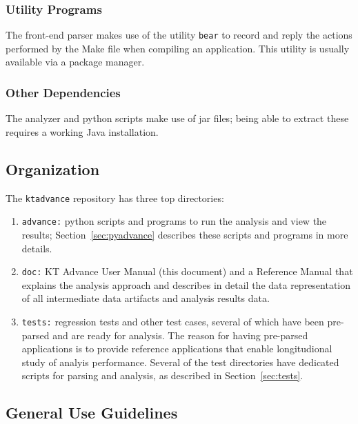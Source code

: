 \documentclass[11pt]{article}
\begin{document}
\subsubsection{Utility Programs}
The front-end parser makes use of the utility {\tt bear} to record and reply the actions
performed by the Make file when compiling an application. This utility is usually available
via a package manager.

\subsubsection{Other Dependencies}
The analyzer and python scripts make use of jar files; being able to extract these 
requires a working Java installation.

\subsection{Organization}

The {\tt ktadvance} repository has three top directories:
\begin{enumerate}
\item {\tt advance:} python scripts and programs to run the analysis and view the results;
  Section~\ref{sec:pyadvance} describes these scripts and programs in more details.
\item {\tt doc:} KT Advance User Manual (this document) and a Reference Manual that
  explains the analysis approach and describes in detail the data representation of
  all intermediate data artifacts and analysis results data.
\item {\tt tests:} regression tests and other test cases, several of which have been 
  pre-parsed and are ready for analysis. The reason for having pre-parsed applications
  is to provide reference applications that enable longitudional study of analyis 
  performance. Several of the test directories have dedicated scripts for parsing and
  analysis, as described in Section~\ref{sec:tests}.
\end{enumerate}

\subsection{General Use Guidelines}
\end{document}
